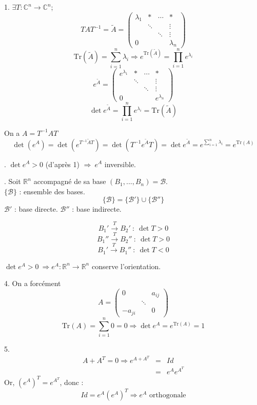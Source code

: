 \begin{dem}
1. $\exists T : \mathbb{C}^n\to \mathbb{C}^n$; \[TAT^{-1}=\tilde{A}=\begin{pmatrix}\lambda_1 & * & \cdots & * \\ & \ddots & & \vdots \\ & & \ddots & \vdots \\ 0 & & & \lambda_n \end{pmatrix}\]
	\[\text{Tr}(\tilde{A})=\sum_{i=1}^n \lambda_i \Rightarrow e^{\text{Tr}(\tilde{A})}=\prod_{i=1}^n e^{\lambda_i}\]
\[e^{\tilde{A}}=\begin{pmatrix}e^{\lambda_1} & * & \cdots & * \\ & \ddots & & \vdots \\ & & \ddots & \vdots \\ 0 & & & e^{\lambda_n} \end{pmatrix}\]
	\[\det e^{\tilde{A}}=\prod_{i=1}^n e^{\lambda_i} = \text{Tr}(\tilde{A})\]

On a $A=T^{-1}AT$
\[\det(e^A)=\det(e^{T^{-1}\tilde{A}T})=\det(T^{-1}e^{\tilde{A}}T)=\det e^{\tilde{A}}=e^{\sum_{i=1}^n \lambda_i} = e^{\text{Tr}(A)}\]

. $\det e^A >0$ (d'après 1) $\Rightarrow\ e^A$ inversible.

. Soit $\mathbb{R}^n$ accompagné de sa base $(B_1,...,B_n)=\mathcal{B}$.\\
$\{\mathcal{B}\}$ : ensemble des bases.
\[\{\mathcal{B}\}=\{\mathcal{B}'\}\cup\{\mathcal{B}''\}\]
$\mathcal{B}'$ : base directe. $\mathcal{B}''$ : base indirecte.

\[B_1' \xrightarrow{T} B_2'\ :\ \det T>0\]
\[B_1'' \xrightarrow{T} B_2''\ :\ \det T>0\]
\[B_1' \xrightarrow{T} B_1''\ :\ \det T<0\]

$\det e^A >0\ \Rightarrow e^A:\mathbb{R}^n\to\mathbb{R}^n$ conserve l'orientation.

4. On a forcément \[A=\begin{pmatrix} 0 & & a_{ij} \\ & \ddots & \\ -a_{ji} & & 0 \end{pmatrix}\]
\[\text{Tr}(A)=\sum_{i=1}^n 0 = 0 \Rightarrow \det e^A = e^{\text{Tr}(A)}=1\]

5. \begin{eqnarray*}
	A+A^T=0 \Rightarrow e^{A+A^T}&=&Id \\ &=&e^Ae^{A^T}
\end{eqnarray*}
Or, $\left(e^A\right)^T=e^{A^T}$, donc :
\[Id=e^A\left(e^A\right)^T \Rightarrow e^A \text{ orthogonale}\]
\end{dem}


